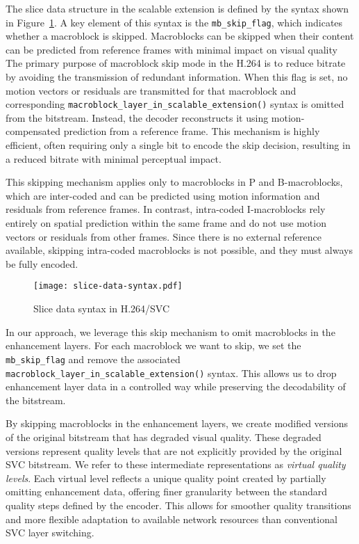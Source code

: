     The slice data structure in the scalable extension is defined by the syntax
    shown in  Figure~\ref{fig:slice-data-syntax}.  A key element of this syntax
    is the \texttt{mb\_skip\_flag}, which indicates whether a macroblock is
    skipped. Macroblocks can be skipped when their content can be
    predicted from reference frames with minimal impact on visual
    quality The primary purpose of macroblock skip mode in the H.264 is to
    reduce bitrate by avoiding the transmission of redundant information.  When
    this flag is set, no motion vectors or residuals are transmitted for that
    macroblock and corresponding
    \texttt{macroblock\_layer\_in\_scalable\_extension()} syntax is omitted from
    the bitstream. Instead, the decoder reconstructs it using motion-compensated
    prediction from a reference frame. This mechanism is highly efficient, often
    requiring only a single bit to encode the skip decision, resulting in a
    reduced bitrate with minimal perceptual impact.


    This skipping mechanism applies only to macroblocks in P and B-macroblocks, which
    are inter-coded and can be predicted using motion information and residuals
    from reference frames. In contrast, intra-coded I-macroblocks rely
    entirely on spatial prediction within the same frame and do not use motion
    vectors or residuals from other frames. Since there is no external reference
    available, skipping intra-coded macroblocks is not possible, and they must
    always be fully encoded.

    \begin{figure}[H]
        \centering
        \texttt{[image: slice-data-syntax.pdf]} 
        \caption{Slice data syntax in H.264/SVC}
        \label{fig:slice-data-syntax}
    \end{figure}

    In our approach, we leverage this skip mechanism to omit
    macroblocks in the enhancement layers. For each macroblock we want to skip,
    we set the \texttt{mb\_skip\_flag} and remove the associated
    \texttt{macroblock\_layer\_in\_scalable\_extension()} syntax. This allows us
    to drop enhancement layer data in a controlled way while preserving
    the decodability of the bitstream.

    By skipping macroblocks in the enhancement layers, we create
    modified versions of the original bitstream that has degraded visual quality.
    These degraded versions represent
    quality levels that are not explicitly provided by the original SVC bitstream.
    We refer to these intermediate representations as \textit{virtual quality
    levels}. Each virtual level reflects a unique quality point created by partially
    omitting enhancement data, offering finer granularity between the standard
    quality steps defined by the encoder. This allows for smoother quality
    transitions and more flexible adaptation to available network resources than
    conventional SVC layer switching.

